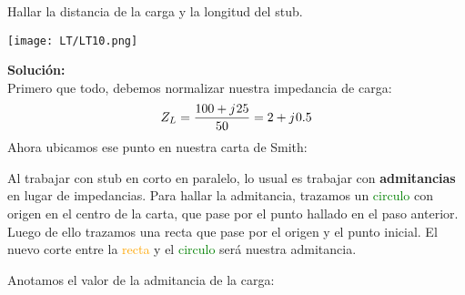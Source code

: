 \documentclass[
	12pt, %
	fleqn, %
	a4paper, %
	oneside, %
]{LegrandOrangeBook}
\begin{document}
\begin{example}
Hallar la distancia de la carga y la longitud del stub.\\
\begin{center}
\texttt{[image: LT/LT10.png]}
\end{center}
\textbf{Solución:}\\
Primero que todo, debemos normalizar nuestra impedancia de carga:
\begin{displaymath}
Z_L=\frac{100+{j\mkern1mu} 25}{50}=2+{j\mkern1mu} 0.5
\end{displaymath}
Ahora ubicamos ese punto en nuestra carta de Smith:
\begin{center}
\end{center}
Al trabajar con stub en corto en paralelo, lo usual es trabajar con \textbf{admitancias} en lugar de impedancias. Para hallar la admitancia, trazamos un \textcolor{green}{circulo} con origen en el centro de la carta, que pase por el punto hallado en el paso anterior. Luego de ello trazamos una recta que pase por el origen y el punto inicial. El nuevo corte entre la \textcolor{orange}{recta} y el \textcolor{green}{circulo} será nuestra admitancia.
\begin{center}
\end{center}
Anotamos el valor de la admitancia de la carga:
\begin{equation*}

\end{equation*}
\end{example}
\end{document}
